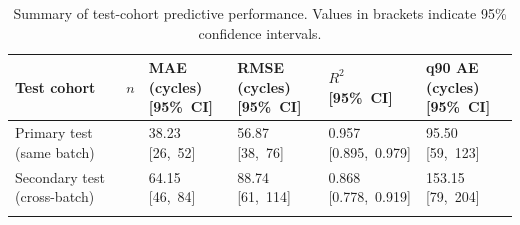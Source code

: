 \documentclass[pdflatex,sn-mathphys-num]{sn-jnl}
\begin{document}
\begin{table}[!ht]
\caption{Summary of test-cohort predictive performance. Values in brackets indicate 95\% confidence intervals.}
\label{tab:heldout_summary}
\centering
\footnotesize
\setlength{\tabcolsep}{1.6pt}
\renewcommand{\arraystretch}{1.50}
\begingroup
\renewcommand{\tabularxcolumn}[1]{m{#1}}
\begin{tabularx}{\textwidth}{
@{}
>{\raggedright\arraybackslash}m{}
>{\centering\arraybackslash}m{}
*{4}{>{\centering\arraybackslash}X}
@{}
}
\toprule
Test cohort 
& $n$ 
& \shortstack{MAE (cycles)\\ \mbox{[95\% CI]}} 
& \shortstack{RMSE (cycles)\\ \mbox{[95\% CI]}} 
& \shortstack{$R^2$\\ \mbox{[95\% CI]}} 
& \shortstack{q90 AE (cycles)\\ \mbox{[95\% CI]}} \\
\midrule
Primary test (same batch) 
& 42 
& \shortstack{38.23\\ \mbox{[26, 52]}} 
& \shortstack{56.87\\ \mbox{[38, 76]}} 
& \shortstack{0.957\\ \mbox{[0.895, 0.979]}} 
& \shortstack{95.50\\ \mbox{[59, 123]}} \\
Secondary test (cross-batch) 
& 40 
& \shortstack{64.15\\ \mbox{[46, 84]}} 
& \shortstack{88.74\\ \mbox{[61, 114]}} 
& \shortstack{0.868\\ \mbox{[0.778, 0.919]}} 
& \shortstack{153.15\\ \mbox{[79, 204]}} \\
\botrule
\end{tabularx}
\endgroup
\end{table}


\end{document}
